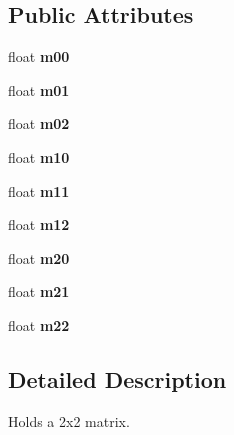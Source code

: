 \subsection*{Public Attributes}
\begin{DoxyCompactItemize}
\item 
\mbox{\label{classflounder_1_1matrix3x3_a465b47630298b5627e2997d77fe729f4}} 
float {\bfseries m00}
\item 
\mbox{\label{classflounder_1_1matrix3x3_a7194989fce437a18fa2c93235ec83135}} 
float {\bfseries m01}
\item 
\mbox{\label{classflounder_1_1matrix3x3_a556ef18a78cf1fb0d5074da28703739a}} 
float {\bfseries m02}
\item 
\mbox{\label{classflounder_1_1matrix3x3_a69f884a34173f41fab37b14345a10ab3}} 
float {\bfseries m10}
\item 
\mbox{\label{classflounder_1_1matrix3x3_acbd3337fafa04c878f3fa4470b64570d}} 
float {\bfseries m11}
\item 
\mbox{\label{classflounder_1_1matrix3x3_afc69abe45ccaed7bea70f105b1a7d340}} 
float {\bfseries m12}
\item 
\mbox{\label{classflounder_1_1matrix3x3_a0fcc7f369143b25fa96fa0afcd6072bc}} 
float {\bfseries m20}
\item 
\mbox{\label{classflounder_1_1matrix3x3_a6ebaddf0733efea893b029b71235e745}} 
float {\bfseries m21}
\item 
\mbox{\label{classflounder_1_1matrix3x3_a3769439070e2da98355d530b0f05a374}} 
float {\bfseries m22}
\end{DoxyCompactItemize}


\subsection{Detailed Description}
Holds a 2x2 matrix. 



